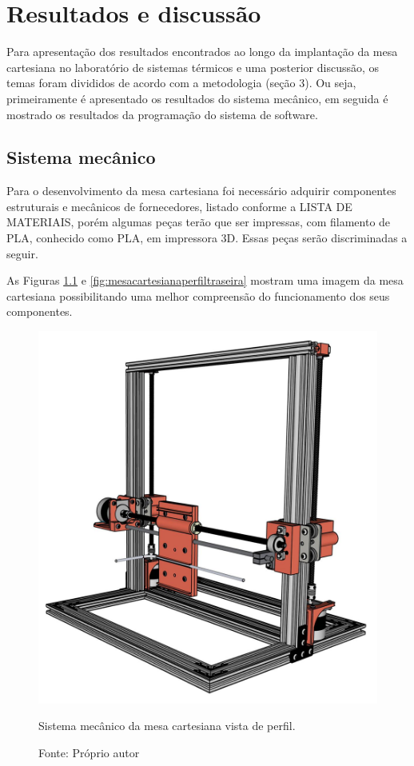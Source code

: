 \chapter{Resultados e discussão}
\label{chap:resultados}

Para apresentação dos resultados encontrados ao longo da implantação da mesa cartesiana no 
laboratório de sistemas térmicos e uma posterior discussão, os temas foram divididos de acordo 
com a metodologia (seção 3). Ou seja, primeiramente é apresentado os resultados do sistema mecânico, 
em seguida é mostrado os resultados da programação do sistema de software.

\section{Sistema mecânico}\label{sec:resmecanico}

Para o desenvolvimento da mesa cartesiana foi necessário adquirir componentes estruturais e 
mecânicos de fornecedores, listado conforme a LISTA DE MATERIAIS, porém algumas peças terão 
que ser impressas, com filamento de \ac{PLA}, conhecido 
como \ac{PLA}, em impressora 3D. Essas peças serão discriminadas a seguir. 

As Figuras \ref{fig:mesacartesianaperfil} e \ref{fig:mesacartesianaperfiltraseira} mostram uma 
imagem da mesa cartesiana possibilitando uma melhor compreensão do funcionamento dos seus componentes.

\begin{figure}[H]
\centering
\includegraphics[scale = 0.35]{figuras/mesacartesianaperfil}
\caption{Sistema mecânico da mesa cartesiana vista de perfil.}
\caption*{Fonte: Próprio autor}
\label{fig:mesacartesianaperfil}
\end{figure}

